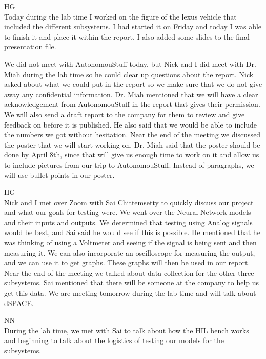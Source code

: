 \documentclass[fontsize=11pt, %
                             paper=letter, %
                             openany, %
                             captions=tableheading,
                             index=totoc,
                             hyperref]{labbook}
\def\currentYear{2021}
\begin{document}
\begin{addmargin}[0cm]{0cm}
HG\\
Today during the lab time I worked on the figure of the lexus vehicle that included the different subsystems. I had started it on Friday and today I was able to finish it and place it within the report. I also added some slides to the final presentation file. 
\linebreak

We did not meet with AutonomouStuff today, but Nick and I did meet with Dr. Miah during the lab time so he could clear up questions about the report. Nick asked about what we could put in the report so we make sure that we do not give away any confidential information. Dr. Miah mentioned that we will have a clear acknowledgement from AutonomouStuff in the report that gives their permission. We will also send a draft report to the company for them to review and give feedback on before it is published. He also said that we would be able to include the numbers we got without hesitation. Near the end of the meeting we discussed the poster that we will start working on. Dr. Miah said that the poster should be done by April 8th, since that will give us enough time to work on it and allow us to include pictures from our trip to AutonomouStuff. Instead of paragraphs, we will use bullet points in our poster. 


\labday{Tuesday, March 29, \currentYear}
HG\\
Nick and I met over Zoom with Sai Chittemsetty to quickly discuss our project and what our goals for testing were. We went over the Neural Network models and their inputs and outputs. We determined that testing using Analog signals would be best, and Sai said he would see if this is possible. He mentioned that he was thinking of using a Voltmeter and seeing if the signal is being sent and then measuring it. We can also incorporate an oscilloscope for measuring the output, and we can use it to get graphs. These graphs will then be used in our report. Near the end of the meeting we talked about data collection for the other three subsystems. Sai mentioned that there will be someone at the company to help us get this data. We are meeting tomorrow during the lab time and will talk about dSPACE. 

\labday{Wednesday, March 30, \currentYear}
NN\\
During the lab time, we met with Sai to talk about how the HIL bench works and beginning to talk about the logistics of testing our models for the subsystems. 


\end{addmargin}
\end{document}
